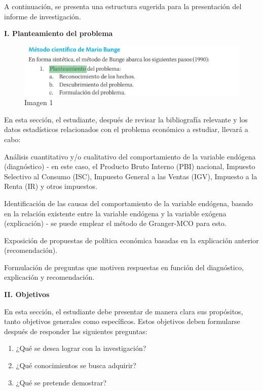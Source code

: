 \documentclass[
  letterpaper,
  DIV=11,
  numbers=noendperiod]{scrartcl}
\providecommand{\tightlist}{%
  \setlength{\itemsep}{0pt}\setlength{\parskip}{0pt}}\usepackage{longtable,booktabs,array}
\begin{document}
A continuación, se presenta una estructura sugerida para la presentación
del informe de investigación.

\textbf{I. Planteamiento del problema}

\begin{figure}

\caption{\label{fig-1}Imagen 1}

{\centering \includegraphics{20230603152205.png}

}

\end{figure}

En esta sección, el estudiante, después de revisar la bibliografía
relevante y los datos estadísticos relacionados con el problema
económico a estudiar, llevará a cabo:

Análisis cuantitativo y/o cualitativo del comportamiento de la variable
endógena (diagnóstico) - en este caso, el Producto Bruto Interno (PBI)
nacional, Impuesto Selectivo al Consumo (ISC), Impuesto General a las
Ventas (IGV), Impuesto a la Renta (IR) y otros impuestos.

Identificación de las causas del comportamiento de la variable endógena,
basado en la relación existente entre la variable endógena y la variable
exógena (explicación) - se puede emplear el método de Granger-MCO para
esto.

Exposición de propuestas de política económica basadas en la explicación
anterior (recomendación).

Formulación de preguntas que motiven respuestas en función del
diagnóstico, explicación y recomendación.

\textbf{II. Objetivos}

En esta sección, el estudiante debe presentar de manera clara sus
propósitos, tanto objetivos generales como específicos. Estos objetivos
deben formularse después de responder las siguientes preguntas:

\begin{enumerate}
\def\labelenumi{\arabic{enumi}.}
\tightlist
\item
  ¿Qué se desea lograr con la investigación?
\item
  ¿Qué conocimientos se busca adquirir?
\item
  ¿Qué se pretende demostrar?
\end{enumerate}
\end{document}
